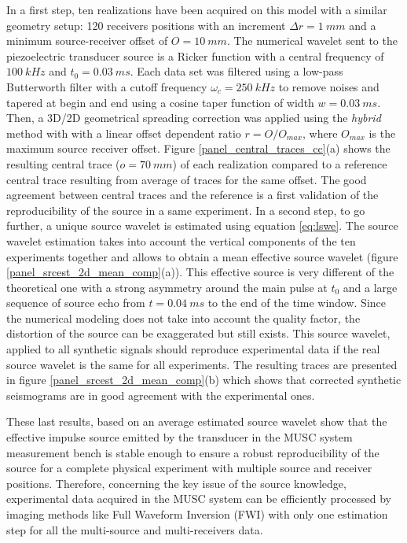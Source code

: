 \documentclass[manuscript,revised]{geophysics}
\begin{document}
\noindent In a first step, ten realizations have been acquired on this model with a similar geometry setup: 120 receivers positions with an increment $\Delta r= 1\ mm$ and a minimum source-receiver offset of $O=10\ mm$. The numerical wavelet sent to the piezoelectric transducer source is a Ricker function with a central frequency of $100\ kHz$ and $t_{0}=0.03\ ms$. Each data set was filtered using a low-pass Butterworth filter with a cutoff frequency $\omega_{c}=250\ kHz$ to remove noises and tapered at begin and end using a cosine taper function of width $w=0.03\ ms$. Then, a 3D/2D geometrical spreading correction was applied using the \textit{hybrid} method with with a linear offset dependent ratio $r=O/O_{max}$, where $O_{max}$ is the maximum source receiver offset. Figure \ref{panel_central_traces_cc}(a) shows the resulting central trace ($o=70\ mm$) of each realization compared to a reference central trace resulting from average of traces for the same offset. The good agreement between central traces and the reference is a first validation of the reproducibility of the source in a same experiment. In a second step, to go further, a unique source wavelet is estimated using equation \ref{eq:lswe}. The source wavelet estimation takes into account the vertical components of the ten experiments together and allows to obtain a mean effective source wavelet (figure \ref{panel_srcest_2d_mean_comp}(a)). This effective source is very different of the theoretical one with a strong asymmetry around the main pulse at $t_{0}$ and a large sequence of source echo from $t=0.04\ ms$ to the end of the time window. Since the numerical modeling does not take into account the quality factor, the distortion of the source can be exaggerated but still exists. This source wavelet, applied to all synthetic signals should reproduce experimental data if the real source wavelet is the same for all experiments. The resulting traces are presented in figure \ref{panel_srcest_2d_mean_comp}(b) which shows that corrected synthetic seismograms are in good agreement with the experimental ones. %

\noindent These last results, based on an average estimated source wavelet show that the effective impulse source emitted by the transducer in the MUSC system measurement bench is stable enough to ensure a robust reproducibility of the source for a complete physical experiment with multiple source and receiver positions. Therefore, concerning the key issue of the source knowledge, experimental data acquired in the MUSC system can be efficiently processed by imaging methods like Full Waveform Inversion (FWI) with only one estimation step for all the multi-source and multi-receivers data.
\end{document}
